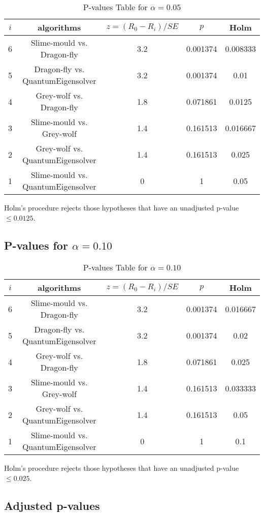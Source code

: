 \documentclass[a4paper,10pt]{article}
\begin{document}
\begin{landscape}
\begin{table}[!htp]
\centering\scriptsize
\begin{tabular}{ccccc}
$i$&algorithms&$z=(R_0 - R_i)/SE$&$p$&Holm\\
\hline6&Slime-mould vs. Dragon-fly&3.2&0.001374&0.008333\\
5&Dragon-fly vs. QuantumEigensolver&3.2&0.001374&0.01\\
4&Grey-wolf vs. Dragon-fly&1.8&0.071861&0.0125\\
3&Slime-mould vs. Grey-wolf&1.4&0.161513&0.016667\\
2&Grey-wolf vs. QuantumEigensolver&1.4&0.161513&0.025\\
1&Slime-mould vs. QuantumEigensolver&0&1&0.05\\
\hline
\end{tabular}
\caption{P-values Table for $\alpha=0.05$}
\end{table}Holm's procedure rejects those hypotheses that have an unadjusted p-value $\le0.0125$.

\pagebreak

\subsection{P-values for $\alpha=0.10$}

\begin{table}[!htp]
\centering\scriptsize
\begin{tabular}{ccccc}
$i$&algorithms&$z=(R_0 - R_i)/SE$&$p$&Holm\\
\hline6&Slime-mould vs. Dragon-fly&3.2&0.001374&0.016667\\
5&Dragon-fly vs. QuantumEigensolver&3.2&0.001374&0.02\\
4&Grey-wolf vs. Dragon-fly&1.8&0.071861&0.025\\
3&Slime-mould vs. Grey-wolf&1.4&0.161513&0.033333\\
2&Grey-wolf vs. QuantumEigensolver&1.4&0.161513&0.05\\
1&Slime-mould vs. QuantumEigensolver&0&1&0.1\\
\hline
\end{tabular}
\caption{P-values Table for $\alpha=0.10$}
\end{table}Holm's procedure rejects those hypotheses that have an unadjusted p-value $\le0.025$.

\pagebreak

\subsection{Adjusted p-values}


\end{landscape}
\end{document}
